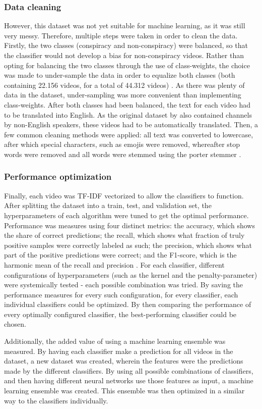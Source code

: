 \documentclass[../main.tex]{subfiles}
\begin{document}
\subsubsection{Data cleaning}
However, this dataset was not yet suitable for machine learning, as it was still very messy. Therefore, multiple steps were taken in order to clean the data. Firstly, the two classes (conspiracy and non-conspiracy) were balanced, so that the classifier would not develop a bias for non-conspiracy videos. Rather than opting for balancing the two classes through the use of class-weights, the choice was made to under-sample the data in order to equalize both classes (both containing 22.156 videos, for a total of 44.312 videos) \citep{lemaitre2017imbalanced}. As there was plenty of data in the dataset, under-sampling was more convenient than implementing class-weights. After both classes had been balanced, the text for each video had to be translated into English. As the original dataset by \citet{ledwich2019algorithmic} also contained channels by non-English speakers, these videos had to be automatically translated. Then, a few common cleaning methods were applied: all text was converted to lowercase, after which special characters, such as emojis were removed, whereafter stop words were removed and all words were stemmed using the porter stemmer \citep{karaa2013new}. 

\subsubsection{Performance optimization}
Finally, each video was TF-IDF vectorized to allow the classifiers to function. After splitting the dataset into a train, test, and validation set, the hyperparameters of each algorithm were tuned to get the optimal performance. Performance was measures using four distinct metrics: the accuracy, which shows the share of correct predictions; the recall, which shows what fraction of truly positive samples were correctly labeled as such; the precision, which shows what part of the positive predictions were correct; and the F1-score, which is the harmonic mean of the recall and precision \citep{sokolova2009systematic}. For each classifier, different configurations of hyperparameters (such as the kernel and the penalty-parameter) were systemically tested - each possible combination was tried. By saving the performance measures for every such configuration, for every classifier, each individual classifiers could be optimized. By then comparing the performance of every optimally configured classifier, the best-performing classifier could be chosen. 

Additionally, the added value of using a machine learning ensemble was measured. By having each classifier make a prediction for all videos in the dataset, a new dataset was created, wherein the features were the predictions made by the different classifiers. By using all possible combinations of classifiers, and then having different neural networks use those features as input, a machine learning ensemble was created. This ensemble was then optimized in a similar way to the classifiers individually.
\end{document}
